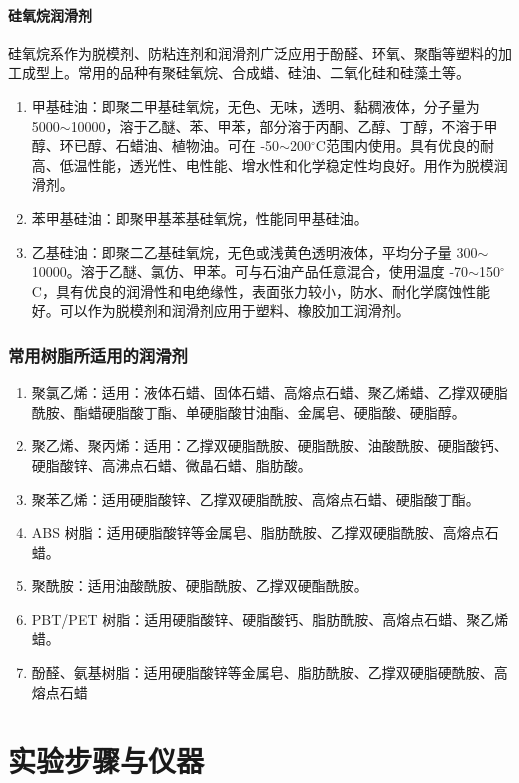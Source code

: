 \documentclass[a4paper, oneside, onecolumn, 12pt]{ctexrep}    %
\newcommand{\cd}{$^{\circ}$C}  %
\begin{document}
\subsubsection{硅氧烷润滑剂}
硅氧烷系作为脱模剂、防粘连剂和润滑剂广泛应用于酚醛、环氧、聚酯等塑料的加工成型上。常用的品种有聚硅氧烷、合成蜡、硅油、二氧化硅和硅藻土等。

\begin{enumerate}
    \item[\ding{192}] 甲基硅油：即聚二甲基硅氧烷，无色、无味，透明、黏稠液体，分子量为 5000$\sim$10000，溶于乙醚、苯、甲苯，部分溶于丙酮、乙醇、丁醇，不溶于甲醇、环已醇、石蜡油、植物油。可在 -50$\sim$200\cd 范围内使用。具有优良的耐高、低温性能，透光性、电性能、增水性和化学稳定性均良好。用作为脱模润滑剂。
    \item[\ding{193}] 苯甲基硅油：即聚甲基苯基硅氧烷，性能同甲基硅油。
    \item[\ding{194}] 乙基硅油：即聚二乙基硅氧烷，无色或浅黄色透明液体，平均分子量 300$\sim$10000。溶于乙醚、氯仿、甲苯。可与石油产品任意混合，使用温度 -70$\sim$150\cd，具有优良的润滑性和电绝缘性，表面张力较小，防水、耐化学腐蚀性能好。可以作为脱模剂和润滑剂应用于塑料、橡胶加工润滑剂。
\end{enumerate}

\subsection{常用树脂所适用的润滑剂}
\begin{enumerate}[(1) ]
    \item 聚氯乙烯：适用：液体石蜡、固体石蜡、高熔点石蜡、聚乙烯蜡、乙撑双硬脂酰胺、酯蜡硬脂酸丁酯、单硬脂酸甘油酯、金属皂、硬脂酸、硬脂醇。
    \item 聚乙烯、聚丙烯：适用：乙撑双硬脂酰胺、硬脂酰胺、油酸酰胺、硬脂酸钙、硬脂酸锌、高沸点石蜡、微晶石蜡、脂肪酸。
    \item 聚苯乙烯：适用硬脂酸锌、乙撑双硬脂酰胺、高熔点石蜡、硬脂酸丁酯。
    \item ABS 树脂：适用硬脂酸锌等金属皂、脂肪酰胺、乙撑双硬脂酰胺、高熔点石蜡。
    \item 聚酰胺：适用油酸酰胺、硬脂酰胺、乙撑双硬酯酰胺。
    \item PBT/PET 树脂：适用硬脂酸锌、硬脂酸钙、脂肪酰胺、高熔点石蜡、聚乙烯蜡。
    \item 酚醛、氨基树脂：适用硬脂酸锌等金属皂、脂肪酰胺、乙撑双硬脂硬酰胺、高熔点石蜡
\end{enumerate}

\chapter{实验步骤与仪器}
\end{document}
